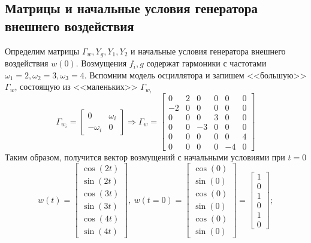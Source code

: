 \documentclass[a4paper, 12pt]{article}
\begin{document}
    \subsection{Матрицы и начальные условия генератора внешнего воздействия}
    Определим матрицы $\Gamma_w,Y_g,Y_1,Y_2$ и начальные условия генератора внешнего воздействия $w(0)$.
    Возмущения $f_i,g$ содержат гармоники с частотами $\omega_1=2,\omega_2=3,\omega_3=4$. Вспомним модель осциллятора
    и запишем <<большую>> $\Gamma_w$, состоящую из <<маленьких>> $\Gamma_{w_i}$
    $$
    \Gamma_{w_i}=\begin{bmatrix}
        0 &\omega_i\\
        -\omega_i &0
    \end{bmatrix}\Rightarrow \Gamma_w=\begin{bmatrix}
        0 &2 &0 &0 &0 &0\\
        -2 &0 &0 &0 &0 &0\\
        0 &0 &0 &3 &0 &0\\
        0 &0 &-3 &0 &0 &0\\
        0 &0 &0 &0 &0 &4\\
        0 &0 &0 &0 &-4 &0
    \end{bmatrix}
    $$
    Таким образом, получится вектор возмущений с начальными условиями при $t=0$
    $$
    w(t)=\begin{bmatrix}
        \cos\left( 2t \right)\\
        \sin\left( 2t \right)\\
        \cos\left( 3t \right)\\
        \sin\left( 3t \right)\\
        \cos\left( 4t \right)\\
        \sin\left( 4t \right)
    \end{bmatrix},\
    w(t=0)=\begin{bmatrix}
        \cos\left( 0 \right)\\
        \sin\left( 0 \right)\\
        \cos\left( 0 \right)\\
        \sin\left( 0 \right)\\
        \cos\left( 0 \right)\\
        \sin\left( 0 \right)
    \end{bmatrix}=\begin{bmatrix}
        1\\
        0\\
        1\\
        0\\
        1\\
        0
    \end{bmatrix};
    $$
\end{document}
